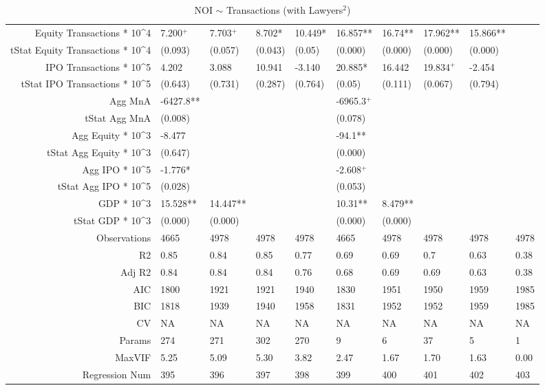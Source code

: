 \begin{table}[ht]
\begin{tabular}{rlllllllll}
  Equity Transactions * 10^4 & 7.200$^{+}$ & 7.703$^{+}$ & 8.702* & 10.449* & 16.857** & 16.74** & 17.962** & 15.866** &  \\ 
  tStat Equity Transactions * 10^4 & (0.093) & (0.057) & (0.043) & (0.05) & (0.000) & (0.000) & (0.000) & (0.000) &  \\ 
  IPO Transactions * 10^5 & 4.202 & 3.088 & 10.941 & -3.140 & 20.885* & 16.442 & 19.834$^{+}$ & -2.454 &  \\ 
  tStat IPO Transactions * 10^5 & (0.643) & (0.731) & (0.287) & (0.764) & (0.05) & (0.111) & (0.067) & (0.794) &  \\ 
  Agg MnA & -6427.8** &  &  &  & -6965.3$^{+}$ &  &  &  &  \\ 
  tStat Agg MnA & (0.008) &  &  &  & (0.078) &  &  &  &  \\ 
  Agg Equity * 10^3 & -8.477 &  &  &  & -94.1** &  &  &  &  \\ 
  tStat Agg Equity * 10^3 & (0.647) &  &  &  & (0.000) &  &  &  &  \\ 
  Agg IPO * 10^5 & -1.776* &  &  &  & -2.608$^{+}$ &  &  &  &  \\ 
  tStat Agg IPO * 10^5 & (0.028) &  &  &  & (0.053) &  &  &  &  \\ 
  GDP * 10^3 & 15.528** & 14.447** &  &  & 10.31** & 8.479** &  &  &  \\ 
  tStat GDP * 10^3 & (0.000) & (0.000) &  &  & (0.000) & (0.000) &  &  &  \\ 
  Observations & 4665 & 4978 & 4978 & 4978 & 4665 & 4978 & 4978 & 4978 & 4978 \\ 
  R2 & 0.85 & 0.84 & 0.85 & 0.77 & 0.69 & 0.69 & 0.7 & 0.63 & 0.38 \\ 
  Adj R2 & 0.84 & 0.84 & 0.84 & 0.76 & 0.68 & 0.69 & 0.69 & 0.63 & 0.38 \\ 
  AIC & 1800 & 1921 & 1921 & 1940 & 1830 & 1951 & 1950 & 1959 & 1985 \\ 
  BIC & 1818 & 1939 & 1940 & 1958 & 1831 & 1952 & 1952 & 1959 & 1985 \\ 
  CV & NA & NA & NA & NA & NA & NA & NA & NA & NA \\ 
  Params & 274 & 271 & 302 & 270 & 9 & 6 & 37 & 5 & 1 \\ 
  MaxVIF & 5.25 & 5.09 & 5.30 & 3.82 & 2.47 & 1.67 & 1.70 & 1.63 & 0.00 \\ 
  Regression Num & 395 & 396 & 397 & 398 & 399 & 400 & 401 & 402 & 403 \\ 
   \hline
\end{tabular}
\caption{NOI $\sim$ Transactions (with Lawyers$^2$)} 
\end{table}
